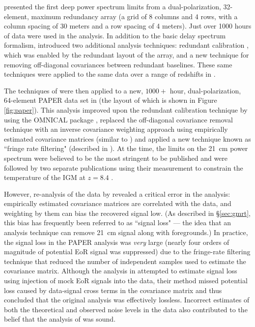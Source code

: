 \cite{parsons14} presented the first deep power spectrum limits from a dual-polarization, 32-element, maximum redundancy array (a grid of 8 columns and 4 rows, with a column spacing of 30 meters and a row spacing of 4 meters).  Just over 1000 hours of data were used in the analysis.  In addition to the basic delay spectrum formalism, \cite{parsons14} introduced two additional analysis techniques: redundant calibration \cite{wieringa92,liu10}, which was enabled by the redundant layout of the array, and a new technique for removing off-diagonal covariances between redundant baselines.  These same techniques were applied to the same data over a range of redshifts in \cite{jacobs15}.

The techniques of \cite{parsons14} were then applied to a new, $1000+$ hour, dual-polarization, 64-element PAPER data set in \cite{ali15} (the layout of which is shown in Figure \ref{fig:paper}).  This analysis improved upon the redundant calibration technique by using the OMNICAL package \cite{zheng14}, replaced the off-diagonal covariance removal technique with an inverse covariance weighting approach using empirically estimated covariance matrices (similar to \cite{dillon15}) and applied a new technique known as ``fringe rate filtering" (described in \cite{parsons16}).  At the time, the \cite{ali15} limits on the 21~cm power spectrum were believed to be the most stringent to be published and were followed by two separate publications using their measurement to constrain the temperature of the IGM at $z=8.4$ \cite{pober15,greig16}.

However, re-analysis of the \cite{ali15} data by \cite{cheng18} revealed a critical error in the analysis: empirically estimated covariance matrices are correlated with the data, and weighting by them can bias the recovered signal low.  (As described in \S\ref{sec:gmrt}, this bias has frequently been referred to as ``signal loss" --- the idea that an analysis technique can remove 21~cm signal along with foregrounds.)  In practice, the signal loss in the PAPER analysis was \emph{very} large (nearly four orders of magnitude of potential EoR signal was suppressed) due to the fringe-rate filtering technique that reduced the number of independent samples used to estimate the covariance matrix.  Although the analysis in \cite{ali15} attempted to estimate signal loss using injection of mock EoR signals into the data, their method missed potential loss caused by data-signal cross terms in the covariance matrix and thus concluded that the original analysis was effectively lossless.  Incorrect estimates of both the theoretical and observed noise levels in the data also contributed to the belief that the analysis of \cite{ali15} was sound.

